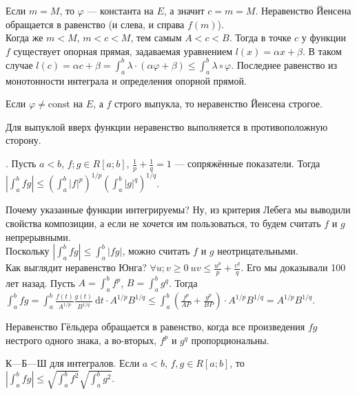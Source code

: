 \documentclass{article}
\begin{document}
\begin{itemize}
\begin{Proof}
            Если $m=M$, то $\varphi$ --- константа на $E$, а значит $c=m=M$. Неравенство Йенсена обращается в равенство (и слева, и справа $f(m)$).\\
            Когда же $m<M$, $m<c<M$, тем самым $A<c<B$. Тогда в точке $c$ у функции $f$ существует опорная прямая, задаваемая уравнением $l(x)=\alpha x+\beta$. В таком случае $l(c)=\alpha c+\beta=\int_a^b\lambda\cdot(\alpha\varphi+\beta)\leqslant\int_a^b\lambda\circ\varphi$. Последнее равенство из монотонности интеграла и определения опорной прямой.
        \end{Proof}
        \begin{Comment}
            Если $\varphi\neq\mathrm{const}$ на $E$, а $f$ строго выпукла, то неравенство Йенсена строгое.
        \end{Comment}
        \begin{Comment}
            Для выпуклой вверх функции неравенство выполняется в противоположную сторону.
        \end{Comment}
        \thm {}. Пусть $a<b$, $f;g\in R[a;b]$, $\frac1p+\frac1q=1$ --- сопряжённые показатели. Тогда $\left|\int_a^bfg\right|\leqslant\left(\int_a^b|f|^p\right)^{1/p}\left(\int_a^b|g|^q\right)^{1/q}$.
        \begin{Proof}
            Почему указанные функции интегрируемы? Ну, из критерия Лебега мы выводили свойства композиции, а если не хочется им пользоваться, то будем считать $f$ и $g$ непрерывными.\\
            Поскольку $\left|\int_a^bfg\right|\leqslant\int_a^b|fg|$, можно считать $f$ и $g$ неотрицательными.\\
            Как выглядит неравенство Юнга? $\forall u;v\geqslant0~uv\leqslant\frac{u^p}p+\frac{v^q}q$. Его мы доказывали 100 лет назад.
            Пусть $A=\int_a^bf^p$, $B=\int_a^bg^q$. Тогда $\int_a^bfg=\int_a^b\frac{f(t)}{A^{1/p}}\frac{g(t)}{B^{1/q}}~\mathrm dt\cdot A^{1/p}B^{1/q}\leqslant\int_a^b\left(\frac{f^p}{AP}+\frac{g^p}{BP}\right)\cdot A^{1/p}B^{1/q}=A^{1/p}B^{1/q}$.
        \end{Proof}
        \begin{Comment}
            Неравенство Гёльдера обращается в равенство, когда все произведения $fg$ нестрого одного знака, а во-вторых, $f^p$ и $g^q$ пропорциональны.
        \end{Comment}
        \thm К---Б---Ш для интегралов. Если $a<b$, $f,g\in R[a;b]$, то $\left|\int_a^bfg\right|\leqslant\sqrt{\int_a^bf^2}\sqrt{\int_a^bg^2}$.

\end{itemize}
\end{document}
